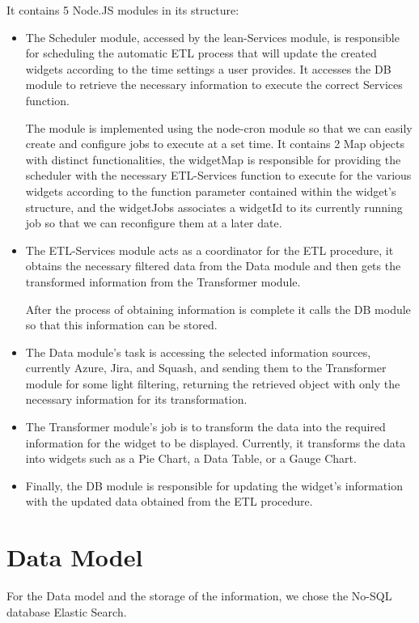 \documentclass[a4paper,twoside,10pt]{report}
\begin{document}
It contains 5 Node.JS modules in its structure:
\begin{itemize}
  \item The Scheduler module, accessed by the lean-Services module, is responsible for scheduling the automatic ETL process that will update the created widgets according to the time settings a user provides. It accesses the DB module to retrieve the necessary information to execute the correct Services function.

The module is implemented using the node-cron\cite{NODECRON} module so that we can easily create and configure jobs to execute at a set time.
It contains 2 Map objects with distinct functionalities, the widgetMap is responsible for providing the scheduler with the necessary ETL-Services function to execute for the various widgets according to the function parameter contained within the widget's structure, and the widgetJobs associates a widgetId to its currently running job so that we can reconfigure them at a later date.
  \item The ETL-Services module acts as a coordinator for the ETL procedure, it obtains the necessary filtered data from the Data module and then gets the transformed information from the Transformer module.

After the process of obtaining information is complete it calls the DB module so that this information can be stored.
  \item The Data module's task is accessing the selected information sources, currently Azure, Jira, and Squash, and sending them to the Transformer module for some light filtering, returning the retrieved object with only the necessary information for its transformation.
  \item The Transformer module's job is to transform the data into the required information for the widget to be displayed. Currently, it transforms the data into widgets such as a Pie Chart, a Data Table, or a Gauge Chart.
  \item Finally, the DB module is responsible for updating the widget's information with the updated data obtained from the ETL procedure.
\end{itemize}

\newpage
\section{Data Model}
For the Data model and the storage of the information, we chose the No-SQL database Elastic Search.
 
\end{document}
